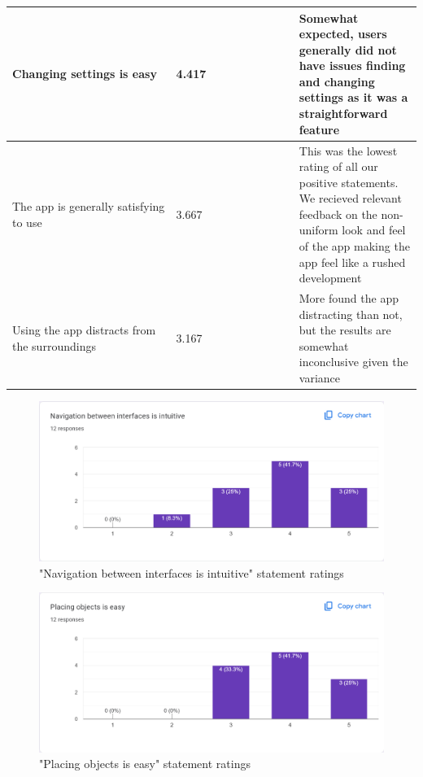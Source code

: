 \documentclass[12pt, titlepage]{article}
\begin{document}
\begin{table}[htbp]
{\begin{tabular}{|p{0.4\linewidth}|p{0.3\linewidth}|p{0.7\linewidth}|}
      \hline
      Changing settings is easy                     & 4.417                                                & Somewhat expected, users generally did not have issues finding and changing settings as it was a straightforward feature                                                           \\
      \hline
      The app is generally satisfying to use        & 3.667                                                & This was the lowest rating of all our positive statements. We recieved relevant feedback on the non-uniform look and feel of the app making the app feel like a rushed development \\
      \hline
      Using the app distracts from the surroundings & 3.167                                                & More found the app distracting than not, but the results are somewhat inconclusive given the variance                                                                              \\
      \hline
    \end{tabular}}
  \label{table:US1}
\end{table}

\begin{figure}[htbp]
  \caption{"Navigation between interfaces is intuitive" statement ratings}
  \centerline{\includegraphics[scale=0.35]{./Images/Q1.png}}
  \label{fig:StraightForward}
\end{figure}

\begin{figure}[htbp]
  \caption{"Placing objects is easy" statement ratings}
  \centerline{\includegraphics[scale=0.35]{./Images/Q2.png}}
  \label{fig:Navigation}
\end{figure}
\end{document}

